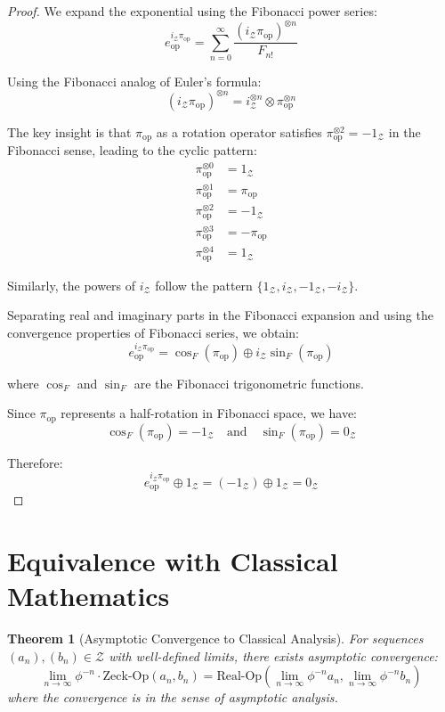 \documentclass[12pt]{article}
\theoremstyle{plain}
\newtheorem{theorem}{Theorem}[section]
\theoremstyle{definition}
\begin{document}
\begin{proof}
We expand the exponential using the Fibonacci power series:
$$e_{\text{op}}^{i_{\mathcal{Z}}\pi_{\text{op}}} = \sum_{n=0}^{\infty} \frac{(i_{\mathcal{Z}}\pi_{\text{op}})^{\otimes n}}{F_{n!}}$$

Using the Fibonacci analog of Euler's formula:
$$(i_{\mathcal{Z}}\pi_{\text{op}})^{\otimes n} = i_{\mathcal{Z}}^{\otimes n} \otimes \pi_{\text{op}}^{\otimes n}$$

The key insight is that $\pi_{\text{op}}$ as a rotation operator satisfies $\pi_{\text{op}}^{\otimes 2} = -1_{\mathcal{Z}}$ in the Fibonacci sense, leading to the cyclic pattern:
\begin{align}
\pi_{\text{op}}^{\otimes 0} &= 1_{\mathcal{Z}}\\
\pi_{\text{op}}^{\otimes 1} &= \pi_{\text{op}}\\
\pi_{\text{op}}^{\otimes 2} &= -1_{\mathcal{Z}}\\
\pi_{\text{op}}^{\otimes 3} &= -\pi_{\text{op}}\\
\pi_{\text{op}}^{\otimes 4} &= 1_{\mathcal{Z}}
\end{align}

Similarly, the powers of $i_{\mathcal{Z}}$ follow the pattern $\{1_{\mathcal{Z}}, i_{\mathcal{Z}}, -1_{\mathcal{Z}}, -i_{\mathcal{Z}}\}$.

Separating real and imaginary parts in the Fibonacci expansion and using the convergence properties of Fibonacci series, we obtain:
$$e_{\text{op}}^{i_{\mathcal{Z}}\pi_{\text{op}}} = \cos_F(\pi_{\text{op}}) \oplus i_{\mathcal{Z}} \sin_F(\pi_{\text{op}})$$

where $\cos_F$ and $\sin_F$ are the Fibonacci trigonometric functions.

Since $\pi_{\text{op}}$ represents a half-rotation in Fibonacci space, we have:
$$\cos_F(\pi_{\text{op}}) = -1_{\mathcal{Z}} \quad \text{and} \quad \sin_F(\pi_{\text{op}}) = 0_{\mathcal{Z}}$$

Therefore:
$$e_{\text{op}}^{i_{\mathcal{Z}}\pi_{\text{op}}} \oplus 1_{\mathcal{Z}} = (-1_{\mathcal{Z}}) \oplus 1_{\mathcal{Z}} = 0_{\mathcal{Z}}$$
\end{proof}

\section{Equivalence with Classical Mathematics}

\begin{theorem}[Asymptotic Convergence to Classical Analysis]
For sequences $(a_n), (b_n) \in \mathcal{Z}$ with well-defined limits, there exists asymptotic convergence:
$$\lim_{n \to \infty} \phi^{-n} \cdot \text{Zeck-Op}(a_n, b_n) = \text{Real-Op}(\lim_{n \to \infty} \phi^{-n} a_n, \lim_{n \to \infty} \phi^{-n} b_n)$$
where the convergence is in the sense of asymptotic analysis.
\end{theorem}
\end{document}
